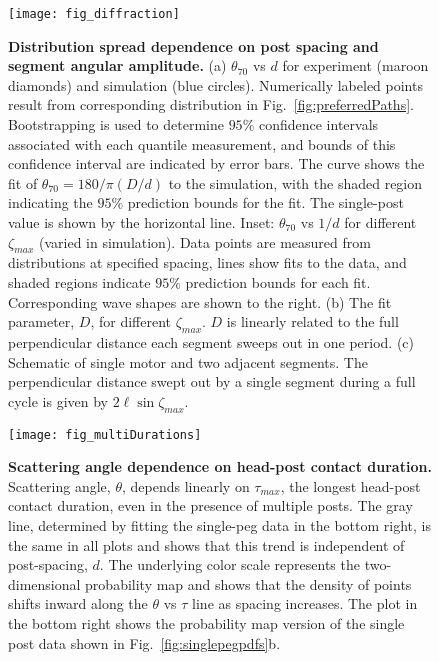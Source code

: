 \documentclass[aps,pre,twocolumn,superscriptaddress]{revtex4-1}
\begin{document}
\begin{figure}[h]
	\texttt{[image: fig\_diffraction]}
	\caption{\textbf{Distribution spread dependence on post spacing and segment angular amplitude.} (a) $\theta_{70}$ vs $d$ for experiment (maroon diamonds) and simulation (blue circles). Numerically labeled points result from corresponding distribution in Fig.~\ref{fig:preferredPaths}. Bootstrapping is used to determine $95\%$ confidence intervals associated with each quantile measurement, and bounds of this confidence interval are indicated by error bars. The curve shows the fit of $\theta_{70} = 180/\pi (D/d)$ to the simulation, with the shaded region indicating the $95\%$ prediction bounds for the fit. The single-post value is shown by the horizontal line. Inset: $\theta_{70}$ vs $1/d$ for different $\zeta_{max}$ (varied in simulation).  Data points are measured from distributions at specified spacing, lines show fits to the data, and shaded regions indicate $95\%$ prediction bounds for each fit. Corresponding wave shapes are shown to the right. (b) The fit parameter, $D$, for different $\zeta_{max}$. $D$ is linearly related to the full perpendicular distance each segment sweeps out in one period. (c) Schematic of single motor and two adjacent segments. The perpendicular distance swept out by a single segment during a full cycle is given by $2\ell \sin \zeta_{max}$.}
	\label{fig:diffraction}
\end{figure}


\begin{figure}[h!]
	\texttt{[image: fig\_multiDurations]}
	\caption{\textbf{Scattering angle dependence on head-post contact duration.}  Scattering angle, $\theta$, depends linearly on $\tau_{max}$, the longest head-post contact duration, even in the presence of multiple posts.  The gray line, determined by fitting the single-peg data in the bottom right, is the same in all plots and shows that this trend is independent of post-spacing, $d$. The underlying color scale represents the two-dimensional probability map and shows that the density of points shifts inward along the $\theta$ vs $\tau$ line as spacing increases. The plot in the bottom right shows the probability map version of the single post data shown in Fig.~\ref{fig:singlepegpdfs}b.} 
	\label{fig:contactDuration}
\end{figure}
\end{document}
